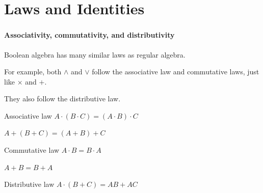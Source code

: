 \documentclass{beamer}
\newenvironment{namedframe}[1]%
	{\begin{frame}\frametitle{\secname}\framesubtitle{#1}}
	{\end{frame}}
\begin{document}
	\section{Laws and Identities}
	\begin{namedframe}{Associativity, commutativity, and distributivity}
		Boolean algebra has many similar laws as regular algebra.

		For example, both $\wedge$ and $\vee$ follow the associative law and commutative laws, just like $\times$ and $+$.

		They also follow the distributive law.
		\begin{center}
			\pause
			\begin{minipage}{0.45\textwidth}
				\begin{block}{Associative law}
					\centering
					$A \cdot (B \cdot C) = (A \cdot B) \cdot C$

					$A + (B + C) = (A + B) + C$
				\end{block}
			\end{minipage}
			\pause
			\begin{minipage}{0.45\textwidth}
				\begin{block}{Commutative law}
					\centering
					$A \cdot B = B \cdot A$

					$A + B = B + A$
				\end{block}
			\end{minipage}
		\end{center}
		\pause
		\begin{block}{Distributive law}
			\centering
			$A \cdot (B + C) = AB + AC$
		\end{block}
	\end{namedframe}
\end{document}
